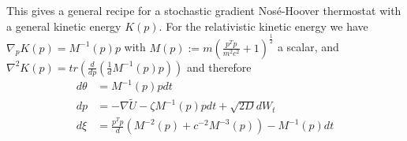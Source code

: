  This gives a general recipe for a stochastic gradient Nosé-Hoover thermostat with a general kinetic energy $K(p)$. For the relativistic kinetic energy we have $\nabla_pK(p) = M^{-1}(p)p$ with $M(p):= m\left(\frac{p^Tp}{m^2c^2}+1\right)^\frac{1}{2}$ a scalar, and $ \nabla^2 K(p) = tr\left(\frac{d}{dp}\left(\frac{1}{d}M^{-1}(p)p\right)\right)$ and therefore
 \begin{align}
 	d\theta &=   M^{-1}(p)p  dt\\
	d p &=  - \nabla\tilde{U}-\zeta M^{-1}(p)p dt + \sqrt{2D}dW_t\\
	d\xi &=  \frac{p^Tp}{d}\left(M^{-2}(p) + c^{-2}M^{-3}(p)\right) - M^{-1}(p)dt
 \end{align}
 